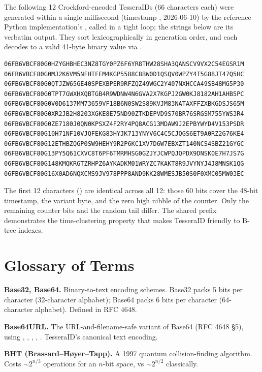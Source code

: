 The following 12 Crockford-encoded TesseraIDs (66 characters each) were generated within a single millisecond (timestamp , 2026-06-10) by the reference Python implementation's , called in a tight loop; the strings below are its verbatim  output. They sort lexicographically in generation order, and each decodes to a valid 41-byte binary value via .

\begin{lstlisting}[basicstyle=\ttfamily\scriptsize]
06FB6VBCF80G0HZYGHBHEC3NZ8TGY0PZ6F6YR8THW28SHA3QANSCV9VX2C54EGSR1M
06FB6VBCF80G0MJ2K6VM5NFHTFEM4KGP5588C8BW0D1QSQV0WPZY4T5G88JT47Q5HC
06FB6VBCF80G0QTJZW65GE40SPEXBPER9RFZQZ49WGC2Y407NXHCCA49SB48MG5P30
06FB6VBCF80G0TPT7GWXHXQBTGB4R9WDNW4N6GVA2X7KGPJ2GW0KJ8182AH1AHB5PC
06FB6VBCF80G0V0D6137MM73659VF18B6N0SW2S89KVJM83NATAXFFZXBKGDSJS65M
06FB6VBCF80G0XR2JB2H8203XGKE8E75ND90ZTKDEPVD9S70BR76SRGSM755YWS3R4
06FB6VBCF80G0ZE7180J0QN0KPSXZ4F2RY4PQ8ACG13MDAW9J2EPBYWYD4V153PSDR
06FB6VBCF80G10H71NF10VJQFEKG83HYJK713YNYV6C4C5CJQGS6ET9A0RZ2G76KE4
06FB6VBCF80G12ETHBZQGP0SW9HEHY9R2P6KC1XV7D6W7EBXZT140NCS4SBZ21GYGC
06FB6VBCF80G13PY5Q61CXVC8T6PF6TMRMHSG0GZJYJCWPQJQPDX9DNSK0E7H7JS7G
06FB6VBCF80G148KMQKRGTZRHPZ6AYKADKM01WRYZC7KAKT8R9JVYNYJ4J8MNSK1QG
06FB6VBCF80G16X0AD6NQXCMS9JV978PPP8AND9KK28WMESJB50S0F0XMC05MW03EC
\end{lstlisting}

The first 12 characters () are identical across all 12: those 60 bits cover the 48-bit timestamp, the  variant byte, and the zero high nibble of the counter. Only the remaining counter bits and the random tail differ. The shared prefix demonstrates the time-clustering property that makes TesseraID friendly to B-tree indexes.

\section{Glossary of Terms}
\label{app:glossary}

\textbf{Base32, Base64.} Binary-to-text encoding schemes. Base32 packs 5 bits per character (32-character alphabet); Base64 packs 6 bits per character (64-character alphabet). Defined in RFC 4648.

\textbf{Base64URL.} The URL-and-filename-safe variant of Base64 (RFC 4648 §5), using , , , \code{-}, \code{\_}. TesseraID's canonical text encoding.

\textbf{BHT (Brassard--H{\o}yer--Tapp).} A 1997 quantum collision-finding algorithm. Costs $\sim 2^{n/3}$ operations for an $n$-bit space, vs $\sim 2^{n/2}$ classically.

